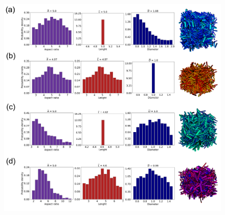 \documentclass[journal=jacsat,manuscript=article]{achemso}
\begin{document}
\begin{figure}[!h]
    \centering
    \includegraphics[width=1\columnwidth]{Figures/Polydisp_hist.png}
    

\end{figure}
\end{document}
